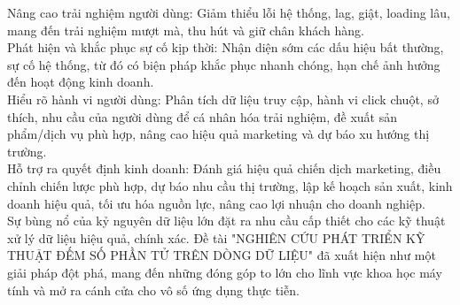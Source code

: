\documentclass[letterpaper,13pt]{article}
\theoremstyle{mytheor}
\begin{document}
Nâng cao trải nghiệm người dùng: Giảm thiểu lỗi hệ thống, lag, giật, loading lâu, mang đến trải nghiệm mượt mà, thu hút và giữ chân khách hàng.\\

Phát hiện và khắc phục sự cố kịp thời: Nhận diện sớm các dấu hiệu bất thường, sự cố hệ thống, từ đó có biện pháp khắc phục nhanh chóng, hạn chế ảnh hưởng đến hoạt động kinh doanh.\\

Hiểu rõ hành vi người dùng: Phân tích dữ liệu truy cập, hành vi click chuột, sở thích, nhu cầu của người dùng để cá nhân hóa trải nghiệm, đề xuất sản phẩm/dịch vụ phù hợp, 
nâng cao hiệu quả marketing và dự báo xu hướng thị trường.\\

Hỗ trợ ra quyết định kinh doanh: Đánh giá hiệu quả chiến dịch marketing, điều chỉnh chiến lược phù hợp, dự báo nhu cầu thị trường, 
lập kế hoạch sản xuất, kinh doanh hiệu quả, tối ưu hóa nguồn lực, nâng cao lợi nhuận cho doanh nghiệp.\\

Sự bùng nổ của kỷ nguyên dữ liệu lớn đặt ra nhu cầu cấp thiết cho các kỹ thuật xử lý dữ liệu hiệu quả, chính xác. 
Đề tài "NGHIÊN CỨU PHÁT TRIỂN KỸ THUẬT ĐẾM SỐ PHẦN TỬ TRÊN DÒNG DỮ LIỆU" đã xuất hiện như một giải pháp đột phá, mang đến những đóng góp 
to lớn cho lĩnh vực khoa học máy tính và mở ra cánh cửa cho vô số ứng dụng thực tiễn.\\
\newpage
\printbibliography
\end{document}
